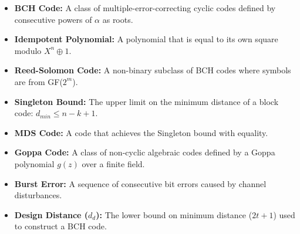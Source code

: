 \documentclass[12pt,a4paper]{article}
\begin{document}
\vspace{6pt}

\begin{tcolorbox}[defbox, title={\textbf{One-Line Definitions}}]
\begin{itemize}[leftmargin=*, itemsep=3pt, topsep=0pt]
  \item \textbf{BCH Code:} A class of multiple-error-correcting cyclic codes defined by consecutive powers of $\alpha$ as roots.
  \item \textbf{Idempotent Polynomial:} A polynomial that is equal to its own square modulo $X^n \oplus 1$.
  \item \textbf{Reed-Solomon Code:} A non-binary subclass of BCH codes where symbols are from GF($2^m$).
  \item \textbf{Singleton Bound:} The upper limit on the minimum distance of a block code: $d_{min} \le n - k + 1$.
  \item \textbf{MDS Code:} A code that achieves the Singleton bound with equality.
  \item \textbf{Goppa Code:} A class of non-cyclic algebraic codes defined by a Goppa polynomial $g(z)$ over a finite field.
  \item \textbf{Burst Error:} A sequence of consecutive bit errors caused by channel disturbances.
  \item \textbf{Design Distance ($d_d$):} The lower bound on minimum distance ($2t+1$) used to construct a BCH code.
\end{itemize}
\end{tcolorbox}

\newpage
\end{document}
